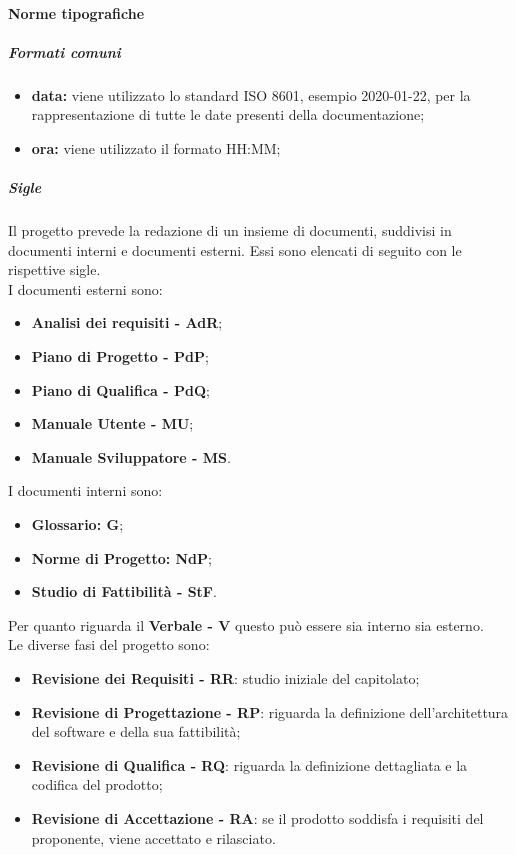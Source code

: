 			\paragraph{Norme tipografiche}
				\subparagraph{Formati comuni}
					\begin{itemize}
						\item \textbf{data:} viene utilizzato lo standard ISO 8601, esempio 2020-01-22, per la rappresentazione di tutte le date presenti della documentazione;
						\item \textbf{ora:} viene utilizzato il formato HH:MM;
					\end{itemize}
				\subparagraph{Sigle}
				Il progetto prevede la redazione di un insieme di documenti, suddivisi in documenti interni e documenti esterni. Essi sono elencati di seguito con le rispettive sigle.\\
				I documenti esterni sono:
				\begin{itemize}
				\item \textbf{Analisi dei requisiti - AdR};
				\item \textbf{Piano di Progetto - PdP};
				\item \textbf{Piano di Qualifica - PdQ};
				\item \textbf{Manuale Utente - MU};
				\item \textbf{Manuale Sviluppatore - MS}.
				\end{itemize}
				I documenti interni sono:
				\begin{itemize}
				\item \textbf{Glossario: G};
				\item \textbf{Norme di Progetto: NdP};
				\item \textbf{Studio di Fattibilità - StF}.
				\end{itemize}
				Per quanto riguarda il \textbf{Verbale - V} questo può essere sia interno sia esterno.
\\
				Le diverse fasi del progetto sono: 
				\begin{itemize}
				\item \textbf{Revisione dei Requisiti - RR}: studio iniziale del capitolato;
				\item \textbf{Revisione di Progettazione - RP}: riguarda la definizione dell'architettura del software e della sua fattibilità;
				\item \textbf{Revisione di Qualifica - RQ}: riguarda la definizione dettagliata e la codifica del prodotto;
				\item \textbf{Revisione di Accettazione - RA}: se il prodotto soddisfa i requisiti del proponente, viene accettato e rilasciato.
				\end{itemize}

